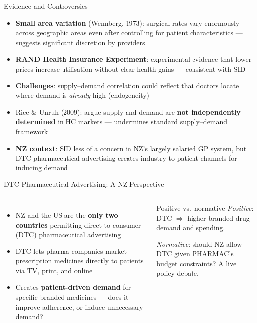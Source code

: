 \documentclass[aspectratio=169, 12pt]{beamer}
\begin{document}
\begin{frame}{Evidence and Controversies}
  \begin{itemize}
    \item \textbf{Small area variation} (Wennberg, 1973): surgical rates vary enormously across
          geographic areas even after controlling for patient characteristics --- suggests
          significant discretion by providers
    \item \textbf{RAND Health Insurance Experiment}: experimental evidence that lower prices
          increase utilisation without clear health gains --- consistent with SID
    \item \textbf{Challenges}: supply--demand correlation could reflect that doctors locate
          where demand is \emph{already} high (endogeneity)
    \item Rice \& Unruh (2009): argue supply and demand are \textbf{not independently
          determined} in HC markets --- undermines standard supply--demand framework
    \item \textbf{NZ context}: SID less of a concern in NZ's largely salaried GP system,
          but DTC pharmaceutical advertising creates industry-to-patient channels for
          inducing demand
  \end{itemize}
\end{frame}

\begin{frame}{DTC Pharmaceutical Advertising: A NZ Perspective}
  \begin{columns}
      \begin{itemize}
        \item NZ and the US are the \textbf{only two countries} permitting
              direct-to-consumer (DTC) pharmaceutical advertising
        \item DTC lets pharma companies market prescription medicines directly to
              patients via TV, print, and online
        \item Creates \textbf{patient-driven demand} for specific branded medicines ---
              does it improve adherence, or induce unnecessary demand?
      \end{itemize}
      \begin{alertblock}{Positive vs.\ normative}
        \small
        \textit{Positive}: DTC $\Rightarrow$ higher branded drug demand and spending.

        \smallskip
        \textit{Normative}: should NZ allow DTC given PHARMAC's budget constraints?
        A live policy debate.
      \end{alertblock}
  \end{columns}
\end{frame}
\end{document}
